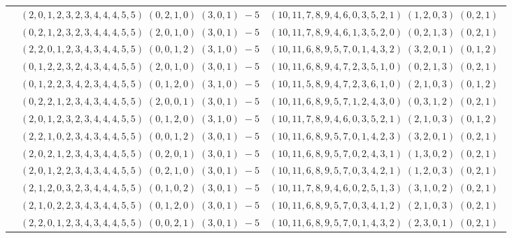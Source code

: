 \documentclass[11pt]{article}
\begin{document}
\begin{longtable}[l]{|c|c|c|}
 \cline{2-3} 
 & $(2 ,0 ,1 ,2 ,3 ,2 ,3 ,4 ,4 ,4 ,5 ,5) \;(0 ,2 ,1 ,0) \;(3 ,0 ,1) \;-5$ & $(10 ,11 ,7 ,8 ,9 ,4 ,6 ,0 ,3 ,5 ,2 ,1) \;(1 ,2 ,0 ,3) \;(0 ,2 ,1) \;$\\ 
 \cline{2-3} 
 & $(0 ,2 ,1 ,2 ,3 ,2 ,3 ,4 ,4 ,4 ,5 ,5) \;(2 ,0 ,1 ,0) \;(3 ,0 ,1) \;-5$ & $(10 ,11 ,7 ,8 ,9 ,4 ,6 ,1 ,3 ,5 ,2 ,0) \;(0 ,2 ,1 ,3) \;(0 ,2 ,1) \;$\\ 
 \cline{2-3} 
 & $(2 ,2 ,0 ,1 ,2 ,3 ,4 ,3 ,4 ,4 ,5 ,5) \;(0 ,0 ,1 ,2) \;(3 ,1 ,0) \;-5$ & $(10 ,11 ,6 ,8 ,9 ,5 ,7 ,0 ,1 ,4 ,3 ,2) \;(3 ,2 ,0 ,1) \;(0 ,1 ,2) \;$\\ 
 \cline{2-3} 
 & $(0 ,1 ,2 ,2 ,3 ,2 ,4 ,3 ,4 ,4 ,5 ,5) \;(2 ,0 ,1 ,0) \;(3 ,0 ,1) \;-5$ & $(10 ,11 ,6 ,8 ,9 ,4 ,7 ,2 ,3 ,5 ,1 ,0) \;(0 ,2 ,1 ,3) \;(0 ,2 ,1) \;$\\ 
 \cline{2-3} 
 & $(0 ,1 ,2 ,2 ,3 ,4 ,2 ,3 ,4 ,4 ,5 ,5) \;(0 ,1 ,2 ,0) \;(3 ,1 ,0) \;-5$ & $(10 ,11 ,5 ,8 ,9 ,4 ,7 ,2 ,3 ,6 ,1 ,0) \;(2 ,1 ,0 ,3) \;(0 ,1 ,2) \;$\\ 
 \cline{2-3} 
 & $(0 ,2 ,2 ,1 ,2 ,3 ,4 ,3 ,4 ,4 ,5 ,5) \;(2 ,0 ,0 ,1) \;(3 ,0 ,1) \;-5$ & $(10 ,11 ,6 ,8 ,9 ,5 ,7 ,1 ,2 ,4 ,3 ,0) \;(0 ,3 ,1 ,2) \;(0 ,2 ,1) \;$\\ 
 \cline{2-3} 
 & $(2 ,0 ,1 ,2 ,3 ,2 ,3 ,4 ,4 ,4 ,5 ,5) \;(0 ,1 ,2 ,0) \;(3 ,1 ,0) \;-5$ & $(10 ,11 ,7 ,8 ,9 ,4 ,6 ,0 ,3 ,5 ,2 ,1) \;(2 ,1 ,0 ,3) \;(0 ,1 ,2) \;$\\ 
 \cline{2-3} 
 & $(2 ,2 ,1 ,0 ,2 ,3 ,4 ,3 ,4 ,4 ,5 ,5) \;(0 ,0 ,1 ,2) \;(3 ,0 ,1) \;-5$ & $(10 ,11 ,6 ,8 ,9 ,5 ,7 ,0 ,1 ,4 ,2 ,3) \;(3 ,2 ,0 ,1) \;(0 ,2 ,1) \;$\\ 
 \cline{2-3} 
 & $(2 ,0 ,2 ,1 ,2 ,3 ,4 ,3 ,4 ,4 ,5 ,5) \;(0 ,2 ,0 ,1) \;(3 ,0 ,1) \;-5$ & $(10 ,11 ,6 ,8 ,9 ,5 ,7 ,0 ,2 ,4 ,3 ,1) \;(1 ,3 ,0 ,2) \;(0 ,2 ,1) \;$\\ 
 \cline{2-3} 
 & $(2 ,0 ,1 ,2 ,2 ,3 ,4 ,3 ,4 ,4 ,5 ,5) \;(0 ,2 ,1 ,0) \;(3 ,0 ,1) \;-5$ & $(10 ,11 ,6 ,8 ,9 ,5 ,7 ,0 ,3 ,4 ,2 ,1) \;(1 ,2 ,0 ,3) \;(0 ,2 ,1) \;$\\ 
 \cline{2-3} 
 & $(2 ,1 ,2 ,0 ,3 ,2 ,3 ,4 ,4 ,4 ,5 ,5) \;(0 ,1 ,0 ,2) \;(3 ,0 ,1) \;-5$ & $(10 ,11 ,7 ,8 ,9 ,4 ,6 ,0 ,2 ,5 ,1 ,3) \;(3 ,1 ,0 ,2) \;(0 ,2 ,1) \;$\\ 
 \cline{2-3} 
 & $(2 ,1 ,0 ,2 ,2 ,3 ,4 ,3 ,4 ,4 ,5 ,5) \;(0 ,1 ,2 ,0) \;(3 ,0 ,1) \;-5$ & $(10 ,11 ,6 ,8 ,9 ,5 ,7 ,0 ,3 ,4 ,1 ,2) \;(2 ,1 ,0 ,3) \;(0 ,2 ,1) \;$\\ 
 \cline{2-3} 
 & $(2 ,2 ,0 ,1 ,2 ,3 ,4 ,3 ,4 ,4 ,5 ,5) \;(0 ,0 ,2 ,1) \;(3 ,0 ,1) \;-5$ & $(10 ,11 ,6 ,8 ,9 ,5 ,7 ,0 ,1 ,4 ,3 ,2) \;(2 ,3 ,0 ,1) \;(0 ,2 ,1) \;$\\ 

\end{longtable}
\end{document}
